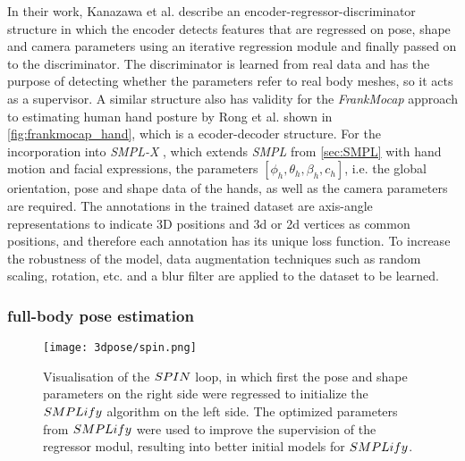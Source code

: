 In their work, Kanazawa et al. \cite{hmr} describe an encoder-regressor-discriminator structure in which the encoder detects features that are regressed on pose, shape and camera parameters using an iterative regression module and finally passed on to the discriminator. The discriminator is learned from real data and has the purpose of detecting whether the parameters refer to real body meshes, so it acts as a supervisor. A similar structure also has validity for the \emph{FrankMocap} approach to estimating human hand posture by Rong et al. shown in \autoref{fig:frankmocap_hand}, which is a ecoder-decoder structure. For the incorporation into \emph{SMPL-X} \cite{smplx}, which extends \emph{SMPL} from \autoref{sec:SMPL} with hand motion and facial expressions, the parameters $[\phi_{h},\theta_{h},\beta_{h},c_{h}]$, i.e. the global orientation, pose and shape data of the hands, as well as the camera parameters are required. The annotations in the trained dataset are axis-angle representations to indicate 3D positions and 3d or 2d vertices as common positions, and therefore each annotation has its unique loss function. To increase the robustness of the model, data augmentation techniques such as random scaling, rotation, etc. and a blur filter are applied to the dataset to be learned.

\subsubsection{full-body pose estimation}
\begin{figure}[h]
	\centering
	\texttt{[image: 3dpose/spin.png]}
	\caption{Visualisation of the $\protect SPIN$ loop, in which first the pose and shape parameters on the right side were regressed to initialize the $\protect SMPLify$ algorithm on the left side. The optimized parameters from $\protect SMPLify$ were used to improve the supervision of the regressor modul, resulting into better initial models for $\protect SMPLify$. \cite{spin}}
	\label{fig:spin}
\end{figure}

